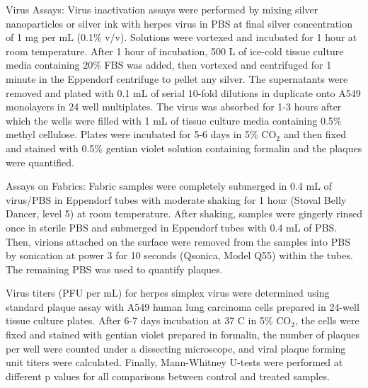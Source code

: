\documentclass[10pt,letterpaper]{article}
\begin{document}
Virus Assays: Virus inactivation assays were performed by mixing silver nanoparticles or silver ink with  herpes virus in PBS at final silver concentration of 1 mg per mL (0.1\% v/v). Solutions were vortexed and incubated for 1 hour %
at room temperature. After 1 hour of incubation, 500 \micro L of ice-cold tissue culture media containing 20\% FBS was added, then vortexed and centrifuged for 1 minute in the Eppendorf centrifuge to pellet any silver. The supernatants were removed and plated with 0.1 mL of serial 10-fold dilutions in duplicate onto A549 monolayers in 24 well multiplates. The virus was absorbed for 1-3 hours after which the wells were filled with 1 mL of tissue culture media containing 0.5\% methyl cellulose.  Plates were incubated for 5-6 days in 5\% CO$_2$ and then fixed and stained with 0.5\% gentian violet solution containing formalin and the plaques were quantified.

Assays on Fabrics: Fabric samples were completely submerged in 0.4 mL of virus/PBS in Eppendorf tubes with moderate shaking for 1 hour (Stoval Belly Dancer, level 5) at room temperature. %
After shaking, samples were gingerly rinsed once in sterile PBS and submerged in Eppendorf tubes with 0.4 mL of PBS. Then, virions attached on the surface were removed from the samples into PBS by sonication at power 3 for 10 seconds (Qsonica, Model Q55) within the tubes. The remaining PBS was used to quantify plaques. 

Virus titers (PFU per mL) for herpes simplex virus were determined using standard plaque assay with A549 human lung carcinoma cells prepared in 24-well tissue culture plates. After 6-7 days incubation at 37 \degree C in 5\% CO$_2$, the cells were fixed and stained with gentian violet prepared in formalin, the number of plaques per well were counted under a dissecting microscope, and viral plaque forming unit titers were calculated. 
Finally, Mann-Whitney U-tests were performed at different p values for all comparisons between control and treated samples.
\end{document}

